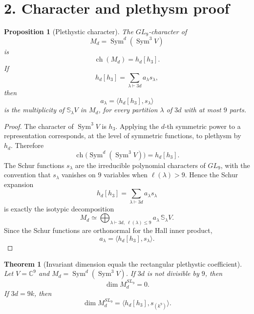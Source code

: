\documentclass[11pt]{article}
\newtheorem{theorem}{Theorem}
\newtheorem{proposition}{Proposition}
\newcommand{\C}{\mathbb C}
\newcommand{\Sym}{\operatorname{Sym}}
\newcommand{\Schur}{\mathbb S}
\newcommand{\ch}{\operatorname{ch}}
\begin{document}
\section*{2. Character and plethysm proof}

\begin{proposition}[Plethystic character]
The \(GL_9\)-character of
\[
    M_d=\Sym^d(\Sym^3 V)
\]
is
\[
    \ch(M_d)=h_d[h_3].
\]
If
\[
    h_d[h_3]=\sum_{\lambda\vdash 3d} a_\lambda s_\lambda,
\]
then
\[
    a_\lambda=\big\langle h_d[h_3],s_\lambda\big\rangle
\]
is the multiplicity of \(\Schur_\lambda V\) in \(M_d\), for every partition
\(\lambda\) of \(3d\) with at most \(9\) parts.
\end{proposition}

\begin{proof}
The character of \(\Sym^3V\) is \(h_3\). Applying the \(d\)-th symmetric power
to a representation corresponds, at the level of symmetric functions, to
plethysm by \(h_d\). Therefore
\[
    \ch\bigl(\Sym^d(\Sym^3V)\bigr)=h_d[h_3].
\]
The Schur functions \(s_\lambda\) are the irreducible polynomial characters of
\(GL_9\), with the convention that \(s_\lambda\) vanishes on \(9\) variables
when \(\ell(\lambda)>9\). Hence the Schur expansion
\[
    h_d[h_3]=\sum_{\lambda\vdash 3d} a_\lambda s_\lambda
\]
is exactly the isotypic decomposition
\[
    M_d\simeq
    \bigoplus_{\lambda\vdash 3d,\ \ell(\lambda)\leq 9}
    a_\lambda\,\Schur_\lambda V.
\]
Since the Schur functions are orthonormal for the Hall inner product,
\[
    a_\lambda=\big\langle h_d[h_3],s_\lambda\big\rangle.
\]
\end{proof}

\begin{theorem}[Invariant dimension equals the rectangular plethystic coefficient]
Let \(V=\C^9\) and \(M_d=\Sym^d(\Sym^3V)\). If \(3d\) is not divisible by \(9\),
then
\[
    \dim M_d^{SL_9}=0.
\]
If \(3d=9k\), then
\[
    \boxed{
    \dim M_d^{SL_9}
    =
    \big\langle h_d[h_3],s_{(k^9)}\big\rangle.
    }
\]
\end{theorem}
\end{document}
